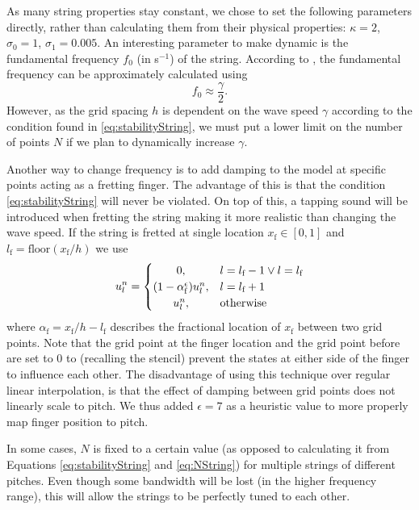 \documentclass{article}
\begin{document}
As many string properties stay constant, we chose to set the following parameters directly, rather than calculating them from their physical properties: $
\kappa = 2$, $\sigma_0 = 1$, $\sigma_1 = 0.005$. An interesting parameter to make dynamic is the fundamental frequency $f_0$ (in s$^{-1}$) of the string. According to \cite{Bilbao2009:NumericalSoundSynthesis}, the fundamental frequency can be approximately calculated using
\begin{equation}
    f_0 \approx \frac{\gamma}{2}.
\end{equation}
However, as the grid spacing $h$ is dependent on the wave speed $\gamma$ according to the condition found in \eqref{eq:stabilityString}, we must put a lower limit on the number of points $N$ if we plan to dynamically increase $\gamma$.

Another way to change frequency is to add damping to the model at specific points acting as a fretting finger. The advantage of this is that the condition \eqref{eq:stabilityString} will never be violated. On top of this, a tapping sound will be introduced when fretting the string making it more realistic than changing the wave speed. If the string is fretted at single location $x_\text{f} \in [0, 1]$ and $l_\text{f} = \text{floor}(x_\text{f}/h)$ we use
\begin{equation}
u_l^n = 
    \begin{cases}
        \hfil 0, & l = l_\text{f} - 1 \vee l = l_\text{f}\\
        \hfil (1-\alpha_\text{f}^\epsilon) u_l^n, & l = l_\text{f} + 1\\
        \hfil u_l^n, & \text{otherwise}
    \end{cases}
\end{equation}
where $\alpha_\text{f} = x_\text{f}/h - l_\text{f}$ describes the fractional location of $x_\text{f}$ between two grid points. Note that the grid point at the finger location and the grid point before are set to 0 to (recalling the stencil) prevent the states at either side of the finger to influence each other. The disadvantage of using this technique over regular linear interpolation, is that the effect of damping between grid points does not linearly scale to pitch. We thus added $\epsilon = 7$ as a heuristic value to more properly map finger position to pitch.

In some cases, $N$ is fixed to a certain value (as opposed to calculating it from Equations \eqref{eq:stabilityString} and \eqref{eq:NString}) for multiple strings of different pitches. Even though some bandwidth will be lost (in the higher frequency range), this will allow the strings to be perfectly tuned to each other.
\end{document}
